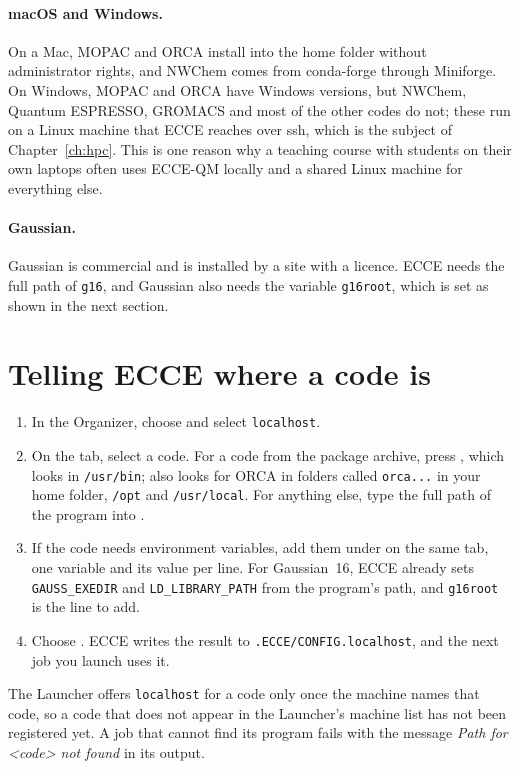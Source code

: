 \paragraph{macOS and Windows.} On a Mac, MOPAC and ORCA install into the home folder without administrator rights, and NWChem comes from conda-forge through Miniforge. On Windows, MOPAC and ORCA have Windows versions, but NWChem, Quantum ESPRESSO, GROMACS and most of the other codes do not; these run on a Linux machine that ECCE reaches over ssh, which is the subject of Chapter~\ref{ch:hpc}. This is one reason why a teaching course with students on their own laptops often uses ECCE-QM locally and a shared Linux machine for everything else.

\paragraph{Gaussian.} Gaussian is commercial and is installed by a site with a licence. ECCE needs the full path of \texttt{g16}, and Gaussian also needs the variable \texttt{g16root}, which is set as shown in the next section.

\section{Telling ECCE where a code is}
\begin{enumerate}
	\item In the Organizer, choose  and select \texttt{localhost}.
	\item On the  tab, select a code. For a code from the package archive, press , which looks in \texttt{/usr/bin};  also looks for ORCA in folders called \texttt{orca...} in your home folder, \texttt{/opt} and \texttt{/usr/local}. For anything else, type the full path of the program into .
	\item If the code needs environment variables, add them under  on the same tab, one variable and its value per line. For Gaussian~16, ECCE already sets \texttt{GAUSS\_EXEDIR} and \texttt{LD\_LIBRARY\_PATH} from the program's path, and \texttt{g16root} is the line to add.
	\item Choose . ECCE writes the result to \texttt{.ECCE/CONFIG.localhost}, and the next job you launch uses it.
\end{enumerate}
The Launcher offers \texttt{localhost} for a code only once the machine names that code, so a code that does not appear in the Launcher's machine list has not been registered yet. A job that cannot find its program fails with the message \emph{Path for <code> not found} in its output.

